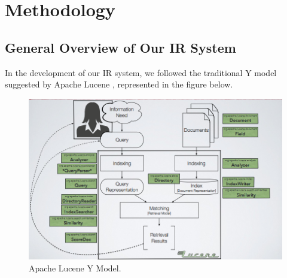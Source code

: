 \section{Methodology}
\label{sec:methodology}

\subsection{General Overview of Our IR System}
In the development of our \ac{IR} system, we followed the traditional Y model suggested by Apache Lucene \cite{lucene}, represented in the figure below.  

\begin{figure}[!h]
    \centering
    \includegraphics[width=0.8\linewidth]{figure/lucene_yModel.png}
    \caption{Apache Lucene Y Model.}
    \label{fig:lucene_yModel}
\end{figure}
  
